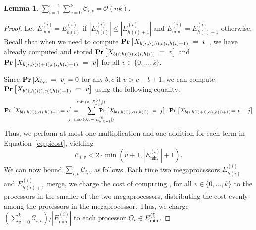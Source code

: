 \documentclass{article}
\newcounter{thmcount}
\newtheorem{lem}[thmcount]{Lemma}
\newcommand{\ens}[1]{\ensuremath{#1}}					\newcommand{\card}[1]{\ens{|#1|}}							\newcommand{\dotlist}[2]{\ens{#1,\ldots,#2}}
\newcommand{\bigoh}[1]{\ens{\mathcal{O}(#1)}}				\newcommand{\bigom}[1]{\ens{\Omega(#1)}}
\newcommand{\processor}{processor}
\newcommand{\megaprocessor}{mega\processor}
\newcommand{\xitot}{\ens{\mathcal C}}
\newcommand{\mergeop}[2]{\ens{E_{#2}^{(#1)}}}
\newcommand{\mopfirst}[2]{\ens{b{(#1,#2)}}}
\newcommand{\moplast}[2]{\ens{c{(#1,#2)}}}
\newcommand{\picost}[2]{\ens{\xitot_{#1,#2}}}
\newcommand{\minmega}[1]{\ens{E_{\min}^{(#1)}}}
\newcommand{\mindex}[1]{\ens{h(#1)}}
\newcommand{\themergeop}[1]{\ens{\mergeop{#1}{\mindex{#1}}}}
\newcommand{\themergeoplus}[1]{\ens{\mergeop{#1}{\mindex{#1}+1}}}
\begin{document}
\begin{lem}
\label{lem:boundxi}
$\sum_{i=1}^{n-1}\sum_{v=0}^{k}\picost iv = \bigoh{nk}$.
\end{lem}

\begin{proof} Let $\minmega i = \themergeop i$ if $\card{\themergeop i} \leq \card{\themergeoplus i}$ and $\minmega i = \themergeoplus i$ otherwise. 
Recall that when we need to compute $\probeq{\mopfirst i{\mindex i}}{\moplast i{\mindex i + 1}}v$, we have already computed and stored $\probeq{\mopfirst i{\mindex i}}{\moplast i{\mindex i}}v$ and $\probeq{\mopfirst i{\mindex i + 1}}{\moplast i{\mindex i + 1}}v$ for all $v\in\{0,\ldots,k\}$. 

Since $\probeq{b}{c}v = 0$ for any $b,c$ if $v>c-b+1$, we can compute $\probeq{\mopfirst i{\mindex i}}{\moplast i{\mindex i + 1}}v$ using the following equality: 
\begin{equation}
\label{eq:picost}
\probeq{\mopfirst i{\mindex i}}{\moplast i{\mindex i + 1}\hspace{-2mm}}{\hspace{-1mm}v} = 
\hspace{-7mm}
\sum_{j=\max(0,v-\card{\themergeoplus i})}^{\min(v,\card{\themergeop i})} 
\hspace{-10mm}
\probeq{\mopfirst i{\mindex i}}{\moplast i{\mindex i}}j \cdot \probeq{\mopfirst i{\mindex i + 1}}{\moplast i{\mindex i + 1}\hspace{-2mm}}{\hspace{-1mm}v-j}
\end{equation}
Thus, we perform at most one multiplication and one addition for each term in Equation~\ref{eq:picost}, yielding
\begin{equation}
\label{eq:costbound}
\picost iv < 2\cdot\min(v+1,\card{\minmega i}+1).
\end{equation}
We can now bound $\sum_{i,v} \picost iv$ as follows. Each time two {\megaprocessor}s \themergeop i and \themergeoplus i merge, we charge the cost of computing \probeq{\mopfirst i{\mindex i}}{\moplast i{\mindex i + 1}}{v}, for all $v\in\{0,\ldots,k\}$ to the {\processor}s in the smaller of the two {\megaprocessor}s, distributing the cost evenly among the {\processor}s in the {\megaprocessor}. 
Thus, we charge $(\sum_{v=0}^{k}\picost iv)/\card{\minmega i}$ to each {\processor} $\op{i} \in \minmega i$. 





\end{proof}
\end{document}
